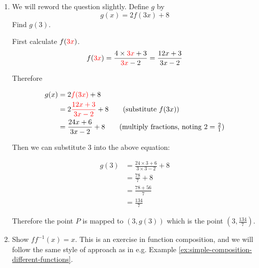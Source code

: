 \begin{solution}
\begin{enumerate}
        Hence we have found
        \[ ff(x) = \frac{19x + 6}{2x + 7} \;\;\;\; x \neq 2, \; x \neq -\frac{7}{2}\]

        \item 
        We will reword the question slightly. Define $g$ by 
        \[g(x) = 2f(3x) + 8\]
        Find $g(3)$.

        First calculate $f(\textcolor{red}{3x})$.
        \[ f(\textcolor{red}{3x}) = \frac{4\times \textcolor{red}{3x} + 3}{\textcolor{red}{3x}-2} = \frac{12x + 3}{3x-2}\]
        
        Therefore 

        \begin{align*}
            g(x) &= 2\textcolor{red}{f(3x)} + 8 \\
             &= 2\textcolor{red}{ \frac{12x + 3}{3x-2}} + 8 \tag{substitute $f(3x)$} \\
             &=  \frac{24x + 6}{3x - 2} + 8 \tag{multiply fractions, noting $2 = \frac{2}{1}$}
        \end{align*}

        Then we can substitute $3$ into the above equation:

        \begin{align*}
            g(3) &= \frac{24 \times 3 + 6}{3 \times 3 - 2} + 8 \\
             &= \frac{78}{7} + 8 \\
             &= \frac{78 + 56}{7} \\
             &= \frac{134}{7}
        \end{align*}

        Therefore the point $P$ is mapped to $(3, g(3))$ which is the point $(3,\frac{134}{7})$.

        \item Show $ff^{-1}(x) = x$.
        This is an exercise in function composition, and we will follow the same style of approach as in e.g. Example \ref{ex:simple-composition-different-functions}.


\end{enumerate}
\end{solution}
